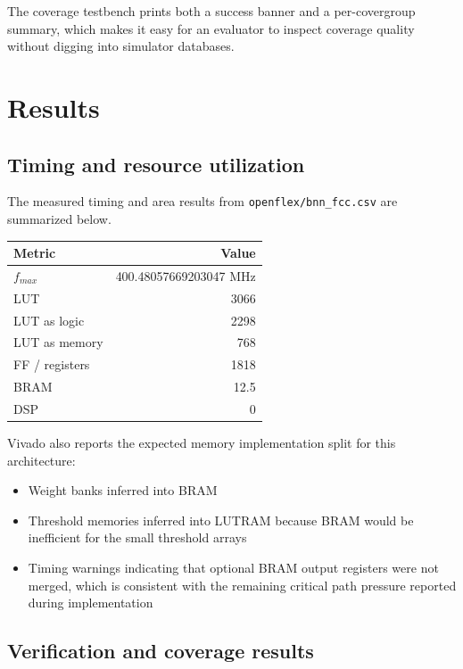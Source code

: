 \documentclass[11pt]{article}
\begin{document}
The coverage testbench prints both a success banner and a per-covergroup summary, which makes it easy for an evaluator to inspect coverage quality without digging into simulator databases.

\section{Results}

\subsection{Timing and resource utilization}

The measured timing and area results from \texttt{openflex/bnn\_fcc.csv} are summarized below.

\begin{center}
\begin{tabular}{lr}
\toprule
Metric & Value \\
\midrule
$f_{max}$ & 400.48057669203047 MHz \\
LUT & 3066 \\
LUT as logic & 2298 \\
LUT as memory & 768 \\
FF / registers & 1818 \\
BRAM & 12.5 \\
DSP & 0 \\
\bottomrule
\end{tabular}
\end{center}

Vivado also reports the expected memory implementation split for this architecture:

\begin{itemize}[leftmargin=1.5em]
\item Weight banks inferred into BRAM
\item Threshold memories inferred into LUTRAM because BRAM would be inefficient for the small threshold arrays
\item Timing warnings indicating that optional BRAM output registers were not merged, which is consistent with the remaining critical path pressure reported during implementation
\end{itemize}

\subsection{Verification and coverage results}
\label{sec:verification-results}
\end{document}
